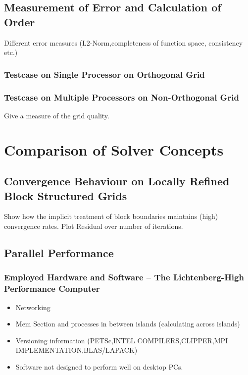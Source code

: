 \documentclass[article,type=msc,colorback,accentcolor=tud2a]{tudthesis}
\begin{document}
    \subsection{Measurement of Error and Calculation of Order}
      Different error measures (L2-Norm,completeness of function space, consistency etc.)

      \subsubsection{Testcase on Single Processor on Orthogonal Grid}
      \subsubsection{Testcase on Multiple Processors on Non-Orthogonal Grid}

        Give a measure of the grid quality.

  \section{Comparison of Solver Concepts}
  
    \subsection{Convergence Behaviour on Locally Refined Block Structured Grids}

      Show how the implicit treatment of block boundaries maintains (high) convergence rates. Plot Residual over number of iterations.

    \subsection{Parallel Performance}
      \subsubsection{Employed Hardware and Software -- The Lichtenberg-High Performance Computer }
        \begin{itemize}
          \item Networking
          \item Mem Section and processes in between islands (calculating across islands)
          \item Versioning information (PETSc,INTEL COMPILERS,CLIPPER,MPI IMPLEMENTATION,BLAS/LAPACK)
          \item Software not designed to perform well on desktop PCs.
        \end{itemize}
\end{document}
